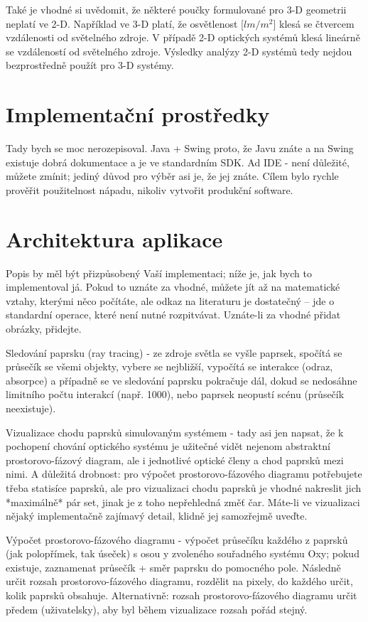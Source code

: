 Také je vhodné si uvědomit, že některé poučky formulované pro 3-D
geometrii neplatí ve 2-D. Například ve 3-D platí, že osvětlenost
[$lm/m^2$] klesá se čtvercem vzdálenosti od světelného zdroje. V případě
2-D optických systémů klesá lineárně se vzdáleností od světelného
zdroje. Výsledky analýzy 2-D systémů tedy nejdou bezprostředně použít
pro 3-D systémy.



\section{Implementační prostředky}

Tady bych se moc nerozepisoval. Java + Swing proto, že Javu znáte a na
Swing existuje dobrá dokumentace a je ve standardním SDK. Ad IDE - není
důležité, můžete zmínit; jediný důvod pro výběr asi je, že jej znáte.
Cílem bylo rychle prověřit použitelnost nápadu, nikoliv vytvořit
produkční software.



\section{Architektura aplikace}

Popis by měl být přizpůsobený Vaší implementaci; níže je, jak bych to
implementoval já. Pokud to uznáte za vhodné, můžete jít až na
matematické vztahy, kterými něco počítáte, ale odkaz na literaturu je
dostatečný -- jde o standardní operace, které není nutné rozpitvávat.
Uznáte-li za vhodné přidat obrázky, přidejte.

Sledování paprsku (ray tracing) - ze zdroje světla se vyšle paprsek,
spočítá se průsečík se všemi objekty, vybere se nejbližší, vypočítá se
interakce (odraz, absorpce) a případně se ve sledování paprsku pokračuje
dál, dokud se nedosáhne limitního počtu interakcí (např. 1000), nebo
paprsek neopustí scénu (průsečík neexistuje).

Vizualizace chodu paprsků simulovaným systémem - tady asi jen napsat, že
k pochopení chování optického systému je užitečné vidět nejenom
abstraktní prostorovo-fázový diagram, ale i jednotlivé optické členy a
chod paprsků mezi nimi. A důležitá drobnost: pro výpočet
prostorovo-fázového diagramu potřebujete třeba statisíce paprsků, ale
pro vizualizaci chodu paprsků je vhodné nakreslit jich *maximálně* pár
set, jinak je z toho nepřehledná změť čar. Máte-li ve vizualizaci nějaký
implementačně zajímavý detail, klidně jej samozřejmě uveďte.

Výpočet prostorovo-fázového diagramu - výpočet průsečíku každého z
paprsků (jak polopřímek, tak úseček) s osou y zvoleného souřadného
systému Oxy; pokud existuje, zaznamenat průsečík + směr paprsku do
pomocného pole. Následně určit rozsah prostorovo-fázového diagramu,
rozdělit na pixely, do každého určit, kolik paprsků obsahuje.
Alternativně: rozsah prostorovo-fázového diagramu určit předem
(uživatelsky), aby byl během vizualizace rozsah pořád stejný.

